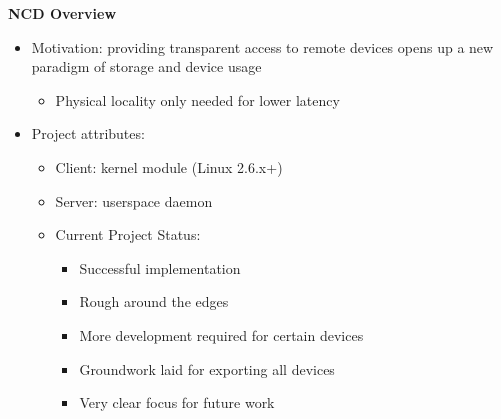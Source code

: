 \documentclass[handout]{beamer}
\begin{document}
\begin{frame}{\bf NCD Overview}
  \begin{itemize}
    \item<1-> Motivation: providing transparent access to remote
      devices opens up a new paradigm of storage and device usage
    \begin{itemize}
      \item<2-> Physical locality only needed for lower latency
    \end{itemize}
    \item<3-> Project attributes:
    \begin{itemize}
      \item<4-> Client: kernel module (Linux 2.6.x+)
      \item<5-> Server: userspace daemon
      \item<6-> Current Project Status:
        \begin{itemize}
          \item<7-> Successful implementation
          \item<8-> Rough around the edges
          \item<9-> More development required for certain devices
          \item<10-> Groundwork laid for exporting all devices
          \item<11-> Very clear focus for future work
        \end{itemize}
      \end{itemize}
  \end{itemize}
\end{frame}
\end{document}
